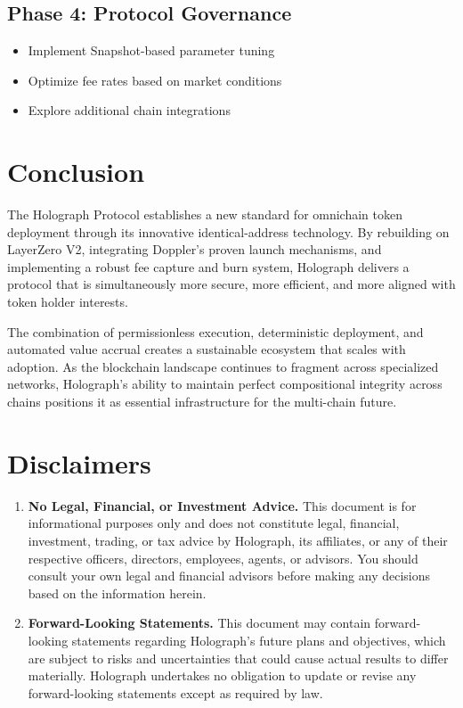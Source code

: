 \documentclass[10pt,a4paper,twocolumn]{article}
\begin{document}
\subsection*{Phase 4: Protocol Governance}
\begin{itemize}
  \item Implement Snapshot-based parameter tuning
  \item Optimize fee rates based on market conditions
  \item Explore additional chain integrations
\end{itemize}

\section{Conclusion}
The Holograph Protocol establishes a new standard for omnichain token deployment through its innovative identical-address technology. By rebuilding on LayerZero V2, integrating Doppler's proven launch mechanisms, and implementing a robust fee capture and burn system, Holograph delivers a protocol that is simultaneously more secure, more efficient, and more aligned with token holder interests.

The combination of permissionless execution, deterministic deployment, and automated value accrual creates a sustainable ecosystem that scales with adoption. As the blockchain landscape continues to fragment across specialized networks, Holograph's ability to maintain perfect compositional integrity across chains positions it as essential infrastructure for the multi-chain future.

\section*{Disclaimers}
\begin{enumerate}
  \item \textbf{No Legal, Financial, or Investment Advice.}  
    This document is for informational purposes only and does not constitute legal, financial, investment, trading, or tax advice by Holograph, its affiliates, or any of their respective officers, directors, employees, agents, or advisors. You should consult your own legal and financial advisors before making any decisions based on the information herein.
  \item \textbf{Forward-Looking Statements.}  
    This document may contain forward-looking statements regarding Holograph’s future plans and objectives, which are subject to risks and uncertainties that could cause actual results to differ materially. Holograph undertakes no obligation to update or revise any forward-looking statements except as required by law.
\end{enumerate}
\end{document}
